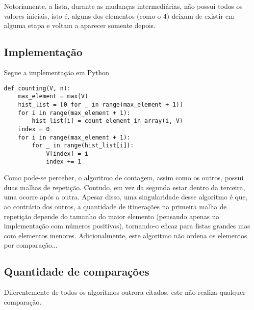Notoriamente, a lista, durante as mudanças intermediárias, não possui todos os valores iniciais, isto é, alguns dos elementos (como o 4) deixam de existir em alguma etapa e voltam a aparecer somente depois.


\subsection{Implementação}
Segue a implementação em Python

\begin{lstlisting}
def counting(V, n):
    max_element = max(V)
    hist_list = [0 for _ in range(max_element + 1)]
    for i in range(max_element + 1):
        hist_list[i] = count_element_in_array(i, V)
    index = 0
    for i in range(max_element + 1):
        for _ in range(hist_list[i]):
            V[index] = i
            index += 1
\end{lstlisting}
Como pode-se perceber, o algoritmo de contagem, assim como os outros, possui duas malhas de repetição. Contudo, em vez da segunda estar dentro da terceira, uma ocorre após a outra.
Apesar disso, uma singularidade desse algoritmo é que, ao contrário dos outros, a quantidade de itinerações na primeira malha de repetição depende do tamanho do maior elemento (pensando apenas na implementação com números positivos), tornando-o eficaz para listas grandes mas com elementos menores.
Adicionalmente, este algoritmo não ordena os elementos por comparação...

\subsection{Quantidade de comparações}
Diferentemente de todos os algoritmos outrora citados, este não realiza qualquer comparação.
